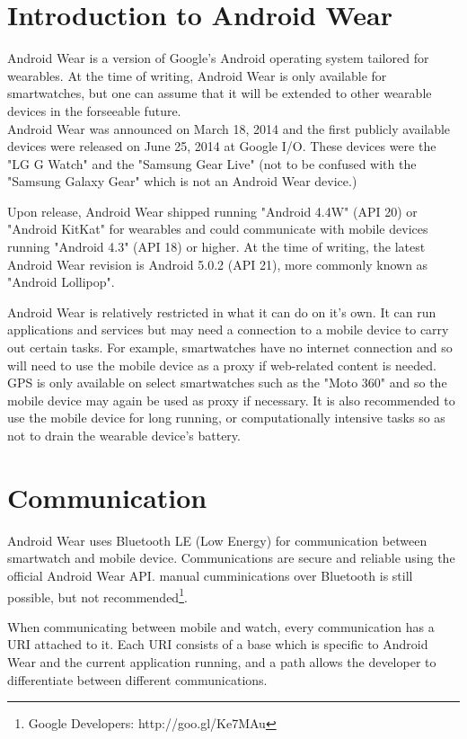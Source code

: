 \section{Introduction to Android Wear}

Android Wear is a version of Google's Android operating system tailored for
wearables. At the time of writing, Android Wear is only available for
smartwatches, but one can assume that it will be extended to other wearable
devices in the forseeable future.\\
Android Wear was announced on March 18, 2014 and the first publicly available
devices were released on June 25, 2014 at Google I/O. These devices were the
"LG G Watch" and the "Samsung Gear Live" (not to be confused with the
"Samsung Galaxy Gear" which is not an Android Wear device.)

Upon release, Android Wear shipped running "Android 4.4W" (API 20) or "Android
KitKat" for wearables and could communicate with mobile devices running
"Android 4.3" (API 18) or higher. At the time of writing, the latest Android
Wear revision is Android 5.0.2 (API 21), more commonly known as "Android
Lollipop".

Android Wear is relatively restricted in what it can do on it's own. It can run
applications and services but may need a connection to a mobile device to carry
out certain tasks. For example, smartwatches have no internet connection and so
will need to use the mobile device as a proxy if web-related content is needed.
GPS is only available on select smartwatches such as the "Moto 360" and so the
mobile device may again be used as proxy if necessary.
It is also recommended to use the mobile device for long running, or
computationally intensive tasks so as not to drain the wearable device's
battery.

\section{Communication}
Android Wear uses Bluetooth LE (Low Energy) for communication between
smartwatch and mobile device. Communications are secure and reliable using the
official Android Wear API. manual cumminications over Bluetooth is still
possible, but not recommended\footnote{Google Developers: http://goo.gl/Ke7MAu}.

When communicating between mobile and watch, every communication has a URI
attached to it. Each URI consists of a base which is specific to Android Wear
and the current application running, and a path allows the developer to
differentiate between different communications.

